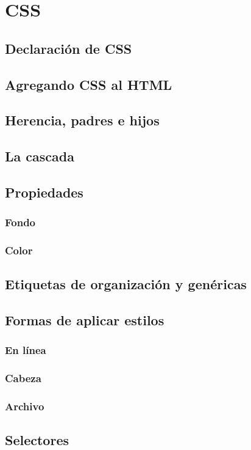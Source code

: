 \documentclass[12pt]{report}
\begin{document}
	\section{CSS}
		\subsection{Declaración de CSS}
		\subsection{Agregando CSS al HTML}
		\subsection{Herencia, padres e hijos}
		\subsection{La cascada}
		\subsection{Propiedades}
			\subsubsection{Fondo}
			\subsubsection{Color}
		\subsection{Etiquetas de organización y genéricas}
		\subsection{Formas de aplicar estilos}
			\subsubsection{En línea}
			\subsubsection{Cabeza}
			\subsubsection{Archivo}
		\subsection{Selectores}
\end{document}
